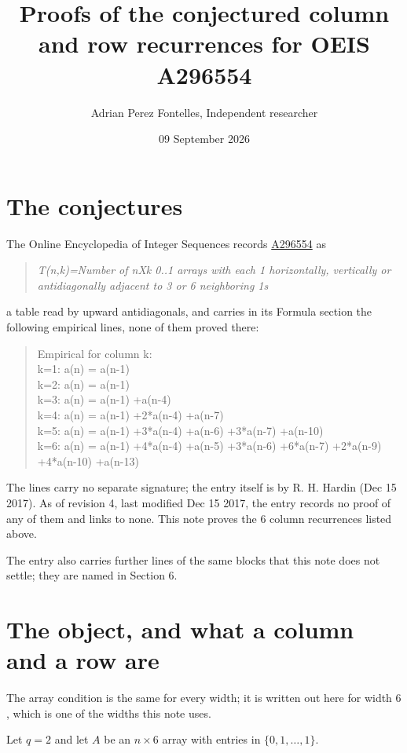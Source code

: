 \documentclass[11pt]{article}
\title{Proofs of the conjectured column and row recurrences for OEIS A296554}
\author{Adrian Perez Fontelles, Independent researcher}
\date{09 September 2026}
\theoremstyle{definition}
\begin{document}
\maketitle
\section{The conjectures}

The Online Encyclopedia of Integer Sequences records \href{https://oeis.org/A296554}{A296554} as

\begin{quote}\itshape T(n,k)=Number of nXk 0..1 arrays with each 1 horizontally, vertically or antidiagonally adjacent to 3 or 6 neighboring 1s\end{quote}

a table read by upward antidiagonals, and carries in its Formula section the following empirical lines, none of them proved there:

\begin{quote}\ttfamily Empirical for column k:\\
k=1: a(n) = a(n-1)\\k=2: a(n) = a(n-1)\\k=3: a(n) = a(n-1) +a(n-4)\\k=4: a(n) = a(n-1) +2*a(n-4) +a(n-7)\\k=5: a(n) = a(n-1) +3*a(n-4) +a(n-6) +3*a(n-7) +a(n-10)\\k=6: a(n) = a(n-1) +4*a(n-4) +a(n-5) +3*a(n-6) +6*a(n-7) +2*a(n-9) +4*a(n-10) +a(n-13)\end{quote}

The lines carry no separate signature; the entry itself is by R. H. Hardin (Dec 15 2017). As of revision 4, last modified Dec 15 2017, the entry records no proof of any of them and links to none. This note proves the 6 column recurrences listed above.

The entry also carries further lines of the same blocks that this note does not settle; they are named in Section 6.

\section{The object, and what a column and a row are}

The array condition is the same for every width; it is written out here for width $6$, which is one of the widths this note uses.

Let $q = 2$ and let $A$ be an $n \times 6$ array with entries in $\{0,1,\dots,1\}$.
\end{document}
